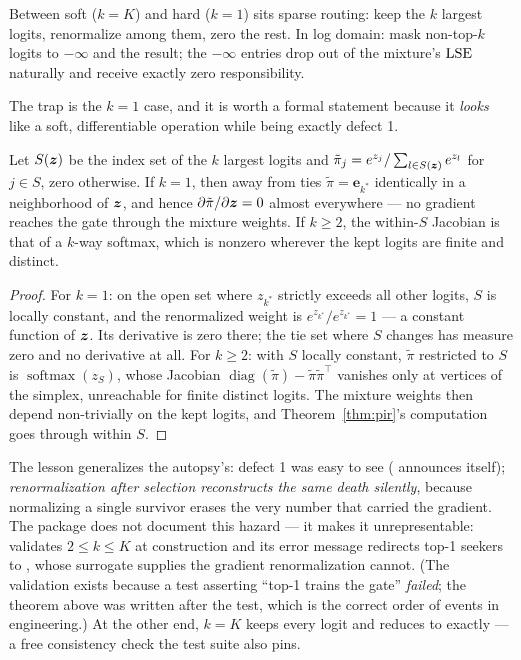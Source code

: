 Between soft ($k = K$) and hard ($k = 1$) sits sparse routing: keep the
$k$ largest logits, renormalize among them, zero the rest. In log domain:
mask non-top-$k$ logits to $-\infty$ and  the result;
the $-\infty$ entries drop out of the mixture's $\operatorname{LSE}$ naturally and
receive exactly zero responsibility.

The trap is the $k = 1$ case, and it is worth a formal statement because
it \emph{looks} like a soft, differentiable operation while being exactly
defect 1.

\begin{theorem}\label{thm:topk}
Let $S(\bm{z})$ be the index set of the $k$ largest logits and
$\tilde\pi_j = e^{z_j} / \sum_{l \in S(\bm{z})} e^{z_l}$ for $j \in S$, zero
otherwise. If $k = 1$, then away from ties $\tilde\pi = \bm{e}_{k^\ast}$
identically in a neighborhood of $\bm{z}$, and hence
$\partial \tilde\pi / \partial \bm{z} = 0$ almost everywhere --- no gradient
reaches the gate through the mixture weights. If $k \ge 2$, the
within-$S$ Jacobian is that of a $k$-way softmax, which is nonzero
wherever the kept logits are finite and distinct.
\end{theorem}

\begin{proof}
For $k = 1$: on the open set where $z_{k^\ast}$ strictly exceeds all
other logits, $S$ is locally constant, and the renormalized weight is
$e^{z_{k^\ast}} / e^{z_{k^\ast}} = 1$ --- a constant function of $\bm{z}$.
Its derivative is zero there; the tie set where $S$ changes has measure
zero and no derivative at all. For $k \ge 2$: with $S$ locally constant,
$\tilde\pi$ restricted to $S$ is $\operatorname{softmax}(z_S)$, whose
Jacobian $\operatorname{diag}(\tilde\pi) - \tilde\pi\tilde\pi^\top$
vanishes only at vertices of the simplex, unreachable for finite
distinct logits. The mixture weights then depend non-trivially on the
kept logits, and Theorem~\ref{thm:pir}'s computation goes through within
$S$.
\end{proof}

The lesson generalizes the autopsy's: defect 1 was easy to see
( announces itself); \emph{renormalization after selection
reconstructs the same death silently}, because normalizing a single
survivor erases the very number that carried the gradient. The package
does not document this hazard --- it makes it unrepresentable:
 validates $2 \le k \le K$ at construction and its
error message redirects top-1 seekers to , whose surrogate
supplies the gradient renormalization cannot. (The validation exists
because a test asserting ``top-1 trains the gate'' \emph{failed}; the
theorem above was written after the test, which is the correct order of
events in engineering.) At the other end, $k = K$ keeps every logit and
reduces to  exactly --- a free consistency check the test
suite also pins.

